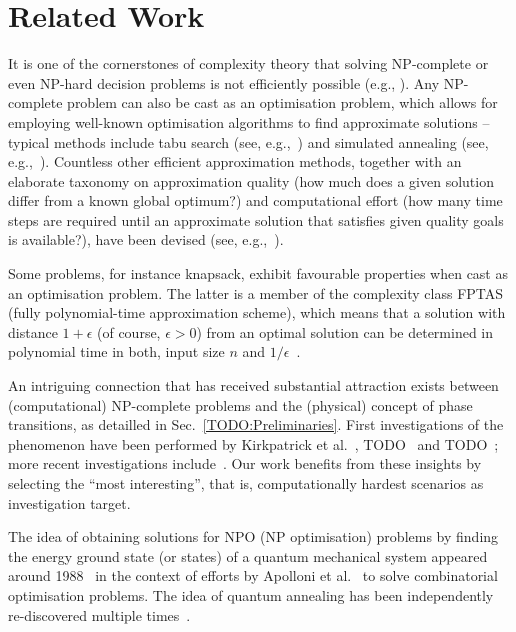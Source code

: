 \section{Related Work}
\label{sec:related-work}

It is one of the cornerstones of complexity theory that solving NP-complete or even NP-hard decision problems is not efficiently possible (e.g., \cite{cook1971complexity,murty1987some}). Any NP-complete problem can also be cast as an optimisation problem, which allows for employing well-known optimisation algorithms to find approximate solutions -- typical methods include tabu search (see, e.g.,~\cite{glover2013tabu, gendreau1994tabu}) and simulated annealing (see, e.g.,~\cite{kirkpatrick1983optimization, chen1995chaotic}). Countless other efficient approximation methods, together with an elaborate taxonomy on approximation quality (how much does a given solution differ from a known global optimum?) and computational effort (how many time steps are required until an approximate solution that satisfies given quality goals is available?), have been devised (see, e.g.,~\cite{NPO-Compendium}).

Some problems, for instance knapsack, exhibit favourable properties when cast as an optimisation problem. The latter is a member of the complexity class FPTAS (fully polynomial-time approximation scheme), which means that a solution with distance \(1+\epsilon\) (of course, $\epsilon > 0$) from an optimal solution can be determined in polynomial time in both, input size \(n\) and \(1/\epsilon\)~\cite{chen1995chaotic}.

An intriguing connection that has received substantial attraction exists between (computational) NP-complete problems and the (physical) concept of phase transitions, as detailled in Sec.~\ref{TODO:Preliminaries}. First investigations of the phenomenon have been performed by Kirkpatrick et al.~\cite{kirkpatrick1994critical}, TODO~\cite{TODO monasson1999determining} and TODO~\cite{TODO}; more recent investigations include~\cite{TODO, TODO, TODO}. Our work benefits from these insights by selecting the ``most interesting'', that is, computationally hardest scenarios as investigation target.

The idea of obtaining solutions for NPO (NP optimisation) problems by finding the energy ground state (or states) of a quantum mechanical system appeared around 1988~\cite{TODO: Originalpaper,albash2016adiabatic} in the context of efforts by Apolloni et al.~\cite{apolloni1989quantum,apolloni1988numerical} to solve combinatorial optimisation problems.  The idea of quantum annealing has been independently re-discovered multiple times~\cite{albash2016adiabatic,finnila1994quantum,amara1993global,kadowaki1998quantum}.

